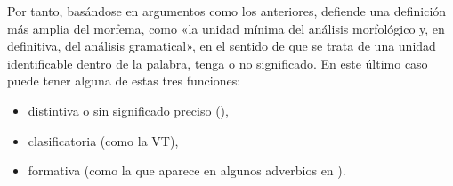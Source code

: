 Por tanto, basándose en argumentos como los anteriores, \textcite[4318]{pena1999}
defiende una definición más amplia del morfema, como «la unidad mínima del
análisis morfológico y, en definitiva, del análisis gramatical», en el sentido
de que se trata de una unidad identificable dentro de la palabra, tenga o no
significado. En este último caso puede tener alguna de estas tres funciones:

\begin{itemize}
  \item distintiva o sin significado preciso (),
  \item clasificatoria (como la VT),
  \item formativa (como la  que aparece en algunos adverbios en
        ).
\end{itemize}

